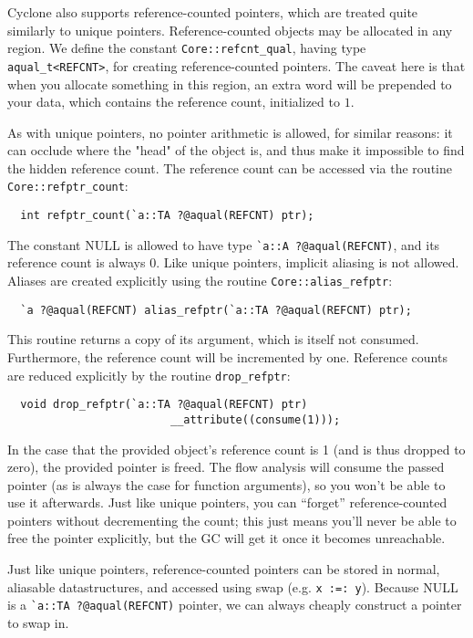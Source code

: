 Cyclone also supports reference-counted pointers, which are treated
quite similarly to unique pointers.  Reference-counted objects may be
allocated in any region. We define the constant
\texttt{Core::refcnt\_qual}, having type \texttt{aqual\_t<REFCNT>}, for
creating reference-counted pointers.  The caveat here is that when you
allocate something in this region, an extra word will be prepended to
your data, which contains the reference count, initialized to $1$.

As with unique pointers, no pointer arithmetic is allowed, for similar
reasons: it can occlude where the "head" of the object is, and thus make
it impossible to find the hidden reference count.  The reference count
can be accessed via the routine \texttt{Core::refptr\_count}:
\begin{verbatim}
  int refptr_count(`a::TA ?@aqual(REFCNT) ptr);
\end{verbatim} %
The constant NULL is allowed to have type
\verb+`a::A ?@aqual(REFCNT)+, and its reference count is always 0.
Like unique pointers, implicit aliasing is not allowed.  Aliases are
created explicitly using the routine \texttt{Core::alias\_refptr}:
\begin{verbatim}
  `a ?@aqual(REFCNT) alias_refptr(`a::TA ?@aqual(REFCNT) ptr);
\end{verbatim} %
This routine returns a copy of its argument, which is itself not consumed.
Furthermore, the reference count will be incremented by one.  Reference
counts are reduced explicitly by the routine \texttt{drop\_refptr}:
\begin{verbatim}
  void drop_refptr(`a::TA ?@aqual(REFCNT) ptr) 
                         __attribute((consume(1)));
\end{verbatim}
In the case that the provided object's reference count is 1 (and is thus
dropped to zero), the provided pointer is freed.  The flow analysis will
consume the passed pointer (as is always the case for function arguments),
so you won't be able to use it afterwards.  Just like unique pointers, you
can ``forget'' reference-counted pointers without decrementing the count;
this just means you'll never be able to free the pointer explicitly, but the
GC will get it once it becomes unreachable.

Just like unique pointers, reference-counted pointers can be stored in
normal, aliasable datastructures, and accessed using swap (e.g. \texttt{x
:=: y}).  Because NULL is a \verb+`a::TA ?@aqual(REFCNT)+ pointer, we can always
cheaply construct a pointer to swap in.  


